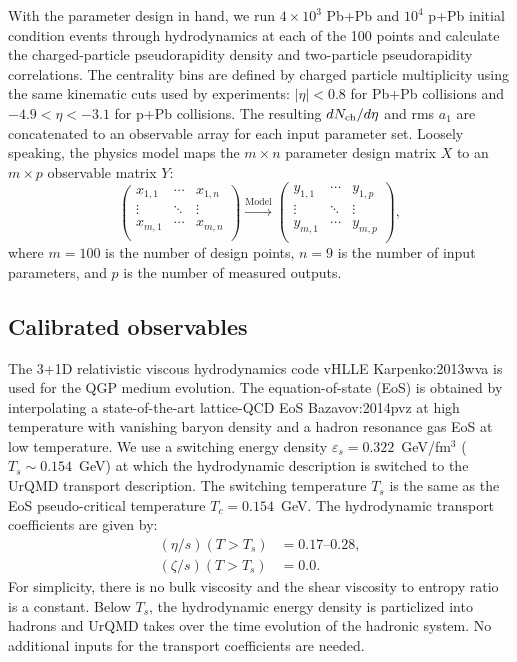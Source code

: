 With the parameter design in hand, we run $4\times 10^3$ Pb+Pb and $10^4$ p+Pb initial condition events through hydrodynamics at each of the 100 points and calculate the charged-particle pseudorapidity density and two-particle pseudorapidity correlations.
The centrality bins are defined by charged particle multiplicity using the same kinematic cuts used by experiments: $|\eta|<0.8$ for Pb+Pb collisions and ${-4.9 < \eta < -3.1}$ for p+Pb collisions.
The resulting $dN_\text{ch}/d\eta$ and rms $a_1$ are concatenated to an observable array for each input parameter set.
Loosely speaking, the physics model maps the $m\times n$ parameter design matrix $X$ to an $m \times p$ observable matrix $Y$:
\begin{equation}
  \begin{pmatrix}
    x_{1,1} & \cdots & x_{1,n} \\
    \vdots  & \ddots & \vdots \\
    x_{m,1} & \cdots & x_{m,n} \\
  \end{pmatrix}
  \xrightarrow{\text{Model}}
  \begin{pmatrix}
    y_{1,1} & \cdots & y_{1,p} \\
    \vdots  & \ddots & \vdots \\
    y_{m,1} & \cdots & y_{m,p} \\
  \end{pmatrix},
  \label{design-obs}
\end{equation}
where $m=100$ is the number of design points, ${n=9}$ is the number of input parameters, and $p$ is the number of measured outputs.

\subsection{Calibrated observables}
The 3+1D relativistic viscous hydrodynamics code \mbox{vHLLE} {Karpenko:2013wva} is used for the QGP medium evolution. 
The equation-of-state (EoS) is obtained by interpolating a state-of-the-art lattice-QCD EoS {Bazavov:2014pvz} at high temperature with vanishing baryon density and a hadron resonance gas EoS at low temperature.
We use a switching energy density $\varepsilon_s = 0.322$~GeV/fm$^3$ ($T_s\sim0.154$~GeV) at which the hydrodynamic description is switched to the UrQMD transport description. 
The switching temperature $T_s$ is the same as the EoS pseudo-critical temperature $T_c = 0.154$~GeV. 
The hydrodynamic transport coefficients are given by:
\begin{align}
  (\eta/s)(T>T_s)  &=  \text{0.17--0.28}, \\
  (\zeta/s)(T>T_s) &=  0.0.
\end{align}
For simplicity, there is no bulk viscosity and the shear viscosity to entropy ratio is a constant.
Below $T_s$, the hydrodynamic energy density is particlized into hadrons and UrQMD takes over the time evolution of the hadronic system.
No additional inputs for the transport coefficients are needed.

